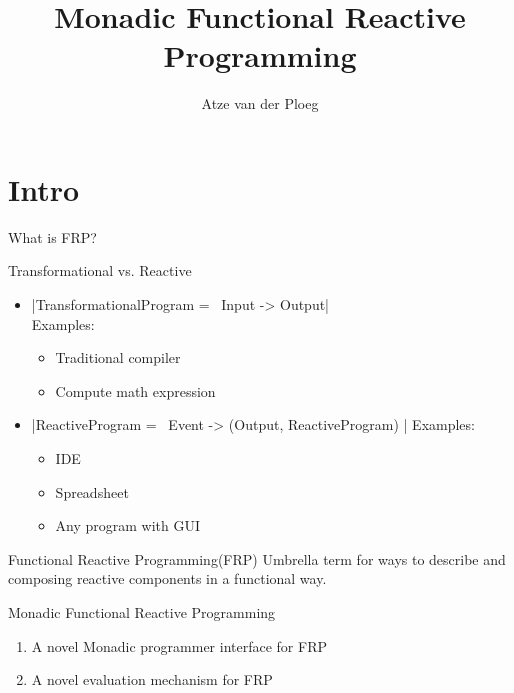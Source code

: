 \documentclass{beamer}
\title{Monadic Functional Reactive Programming}
\author{Atze van der Ploeg}
\institute{
Centrum Wiskunde \& Informatica, Amsterdam, The Netherlands}
\begin{document}



\begin{frame}[plain]
\begin{center}
  \scalebox{12}{$\bind$}
\end{center}
\vspace{-0.5cm}
  \titlepage
\end{frame}
\section{Intro}
\begin{frame}{What is FRP?}
\begin{block}{Transformational vs. Reactive}
\begin{itemize}
\item |TransformationalProgram =~ Input -> Output|\\
Examples: \begin{itemize}
\item Traditional compiler
\item Compute math expression
\end{itemize}

\item |ReactiveProgram =~ Event -> (Output, ReactiveProgram) |
Examples: \begin{itemize}
\item IDE
\item Spreadsheet
\item Any program with GUI
\end{itemize}
\end{itemize}
\end{block}
\pause
\begin{block}{Functional Reactive Programming(FRP)}
Umbrella term for ways to describe and composing reactive components in a functional way.
\end{block}
\end{frame}

\begin{frame}{Monadic Functional Reactive Programming}
\begin{enumerate}
\item A novel Monadic programmer interface for FRP
\item A novel evaluation mechanism for FRP

\end{enumerate}
\end{frame}
\end{document}
